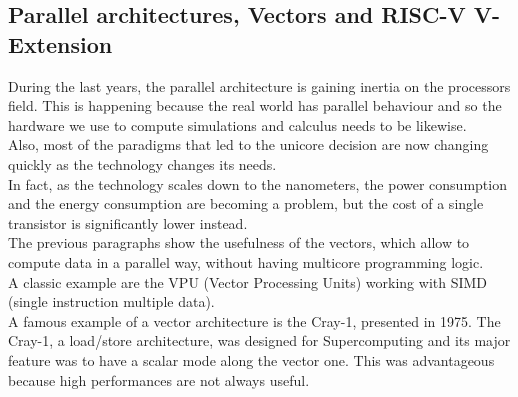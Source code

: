 \subsection{Parallel architectures, Vectors and RISC-V V-Extension}
During the last years, the parallel architecture is gaining inertia on the processors field. This is happening because the real world has parallel behaviour and so the hardware we use to compute simulations and calculus needs to be likewise.\cite{Parallel-Computing}\\
Also, most of the paradigms that led to the unicore decision are now changing quickly as the technology changes its needs.\\
In fact, as the technology scales down to the nanometers, the power consumption and the energy consumption are becoming a problem, but the cost of a single transistor is significantly lower instead.\\


The previous paragraphs show the usefulness of the vectors, which allow to compute data in a parallel way, without having multicore programming logic.\\
A classic example are the VPU (Vector Processing Units) working with SIMD (single instruction multiple data).\\

A famous example of a vector architecture is the Cray-1, presented in 1975.
The Cray-1, a load/store architecture, was designed for Supercomputing and its major feature was to have a scalar mode along the vector one. This was advantageous because high performances are not always useful.\\

